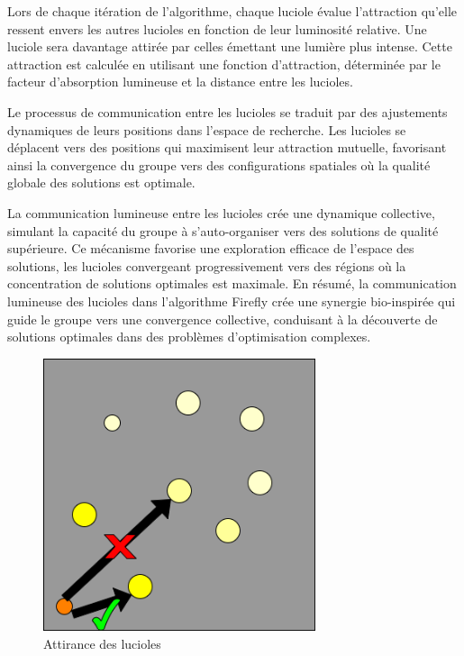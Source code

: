 \documentclass[conference]{IEEEtran}
\begin{document}
Lors de chaque itération de l'algorithme, chaque luciole évalue l'attraction qu'elle ressent envers les autres lucioles en fonction de leur luminosité relative. Une luciole sera davantage attirée par celles émettant une lumière plus intense. Cette attraction est calculée en utilisant une fonction d'attraction, déterminée par le facteur d'absorption lumineuse et la distance entre les lucioles. 

Le processus de communication entre les lucioles se traduit par des ajustements dynamiques de leurs positions dans l'espace de recherche. Les lucioles se déplacent vers des positions qui maximisent leur attraction mutuelle, favorisant ainsi la convergence du groupe vers des configurations spatiales où la qualité globale des solutions est optimale.

La communication lumineuse entre les lucioles crée une dynamique collective, simulant la capacité du groupe à s'auto-organiser vers des solutions de qualité supérieure. Ce mécanisme favorise une exploration efficace de l'espace des solutions, les lucioles convergeant progressivement vers des régions où la concentration de solutions optimales est maximale. En résumé, la communication lumineuse des lucioles dans l'algorithme Firefly crée une synergie bio-inspirée qui guide le groupe vers une convergence collective, conduisant à la découverte de solutions optimales dans des problèmes d'optimisation complexes.

\begin{figure}[ht]
  \centering
  \includegraphics[width=8cm]{Attirance.png}
  \caption{Attirance des lucioles}
  \label{fig:enter-label}
\end{figure}
\end{document}
